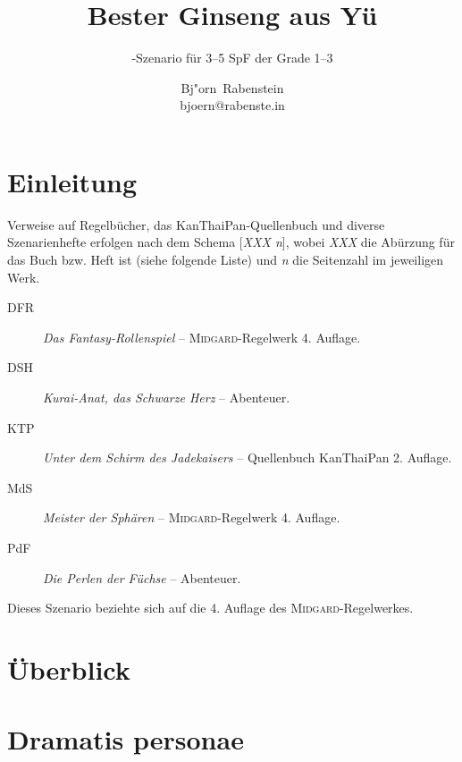 \documentclass[12pt,a4paper,germanpar]{scrartcl}
\author{Bj"orn~Rabenstein\\bjoern@rabenste.in}
\title{Bester Ginseng aus Yü}
\subtitle{\midgard-Szenario für 3--5 SpF der Grade 1--3}
\newcommand{\midgard}{\textsc{Midgard}}
\begin{document}
\maketitle

\tableofcontents


\section{Einleitung}


Verweise auf Regelbücher, das KanThaiPan-Quellenbuch und diverse
Szenarienhefte erfolgen nach dem Schema [\emph{XXX n}], wobei
\emph{XXX} die Abürzung für das Buch bzw. Heft ist (siehe folgende
Liste) und \emph{n} die Seitenzahl im jeweiligen Werk.

\begin{description}
\item[DFR] \emph{Das Fantasy-Rollenspiel} -- \midgard-Regelwerk 4. Auflage.
\item[DSH] \emph{Kurai-Anat, das Schwarze Herz} -- Abenteuer.
\item[KTP] \emph{Unter dem Schirm des Jadekaisers} -- Quellenbuch
  KanThaiPan 2. Auflage.
\item[MdS] \emph{Meister der Sphären} -- \midgard-Regelwerk 4. Auflage.
\item[PdF] \emph{Die Perlen der Füchse} -- Abenteuer.
\end{description}

Dieses Szenario beziehte sich auf die 4. Auflage des \midgard-Regelwerkes.

\section{Überblick}

\section{Dramatis personae}
\end{document}
